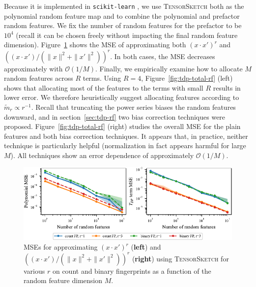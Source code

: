 Because it is implemented in \texttt{scikit-learn} \citep{scikit-learn},
we use \textsc{TensorSketch} \citep{pagh2013compressed}
both as the polynomial random feature map and to combine the polynomial and prefactor
random features.
We fix the number of random features for the prefactor to be $10^4$ (recall it can be chosen freely without impacting the final random feature dimension).
Figure~\ref{fig:tdp-polynomial-and-single-term-error} shows the MSE of approximating both $(x\cdot x')^r$
and $((x\cdot x')/(\|x\|^2+\|x'\|^2))^r$.
In both cases, the MSE decreases approximately with $\mathcal O(1/M)$.
Finally, we empirically examine how to allocate $M$ random features across $R$ terms.
Using $R=4$, Figure~\ref{fig:tdp-total-rf} (left) shows that allocating most of the features to the terms with small $R$ results in lower error.
We therefore heuristically suggest allocating features according to $\tilde{m}_r\propto r^{-1}$.
Recall that truncating the power series biases the random features downward,
and in section~\ref{sec:tdp-rf} two bias correction techniques were proposed.
Figure~\ref{fig:tdp-total-rf} (right) studies the overall MSE for the plain features
and both bias correction techniques.
It appears that, in practice, neither technique is particularly helpful (normalization in fact appears harmful for large $M$).
All techniques show an error dependence of approximately $\mathcal O(1/M)$.

\begin{figure}[ht]
    \centering
    \includegraphics{chapter0x-TRF/new-figures/poly_and_term_term_mse.pdf}
    \caption[Errors of polynomial and single-term random features on real data.]{
        MSEs for approximating $(x\cdot x')^r$ (\textbf{left})
        and $((x\cdot x')/(\|x\|^2+\|x'\|^2))^r$ (\textbf{right})
        using \textsc{TensorSketch} for various $r$ on count and binary fingerprints
        as a function of the random feature dimension $M$.
    }
    \label{fig:tdp-polynomial-and-single-term-error}
\end{figure}


